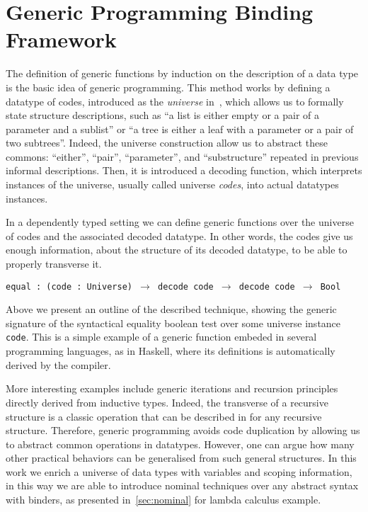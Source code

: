 \documentclass{book}
\begin{document}
\chapter{Generic Programming Binding Framework} \label{sec:generic}

The definition of generic functions by induction on the description of a data type is the basic idea of generic programming. This method works by defining a datatype of codes, introduced as the \emph{universe} in~\cite{MR769301}, which allows us to formally state structure descriptions, such as ``a list is either empty or a pair of a parameter and a sublist'' or ``a tree is either a leaf with a parameter or a pair of two subtrees''. Indeed, the universe construction allow us to abstract these commons: ``either'', ``pair'', ``parameter'', and ``substructure'' repeated in previous informal descriptions. Then, it is introduced a decoding function, which interprets instances of the universe, usually called universe \emph{codes}, into actual datatypes instances. 

In a dependently typed setting we can define generic functions over the universe of codes and the associated decoded datatype. In other words, the codes give us enough information, about the structure of its decoded datatype, to be able to properly transverse it.

 {\small \texttt{equal : (code : Universe) $\rightarrow$  decode code $\rightarrow$\ decode code $\rightarrow$\ Bool}}

Above we present an outline of the described technique, showing the generic signature of the syntactical equality boolean test over some universe instance \texttt{code}. This is a simple example of a generic function embeded in several programming languages, as in Haskell, where its definitions is automatically derived by the compiler. 

More interesting examples include generic iterations and recursion principles directly derived from inductive types. Indeed, the transverse of a recursive structure is a classic operation that can be described in for any recursive structure. Therefore, generic programming avoids code duplication by allowing us to abstract common operations in datatypes. However, one can argue how many other practical behaviors can be generalised from such general structures. In this work we enrich a universe of data types with variables and scoping information, in this way we are able to introduce nominal techniques over any abstract syntax with binders, as presented in~\ref{sec:nominal} for lambda calculus example.
\end{document}
